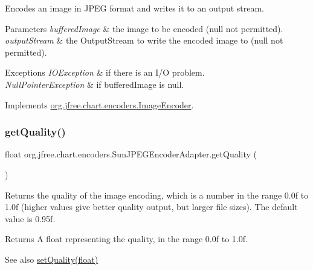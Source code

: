 Encodes an image in J\+P\+EG format and writes it to an output stream.


\begin{DoxyParams}{Parameters}
{\em buffered\+Image} & the image to be encoded ({\ttfamily null} not permitted). \\
\hline
{\em output\+Stream} & the Output\+Stream to write the encoded image to ({\ttfamily null} not permitted).\\
\hline
\end{DoxyParams}

\begin{DoxyExceptions}{Exceptions}
{\em I\+O\+Exception} & if there is an I/O problem. \\
\hline
{\em Null\+Pointer\+Exception} & if {\ttfamily buffered\+Image} is {\ttfamily null}. \\
\hline
\end{DoxyExceptions}


Implements \mbox{\hyperlink{interfaceorg_1_1jfree_1_1chart_1_1encoders_1_1_image_encoder_ad9396ba6a8a9c6f490a31f36f2226dac}{org.\+jfree.\+chart.\+encoders.\+Image\+Encoder}}.

\mbox{\label{classorg_1_1jfree_1_1chart_1_1encoders_1_1_sun_j_p_e_g_encoder_adapter_af9230d0123dd8788669b558a94bb3c03}} 
\subsubsection{\texorpdfstring{get\+Quality()}{getQuality()}}
{\footnotesize\ttfamily float org.\+jfree.\+chart.\+encoders.\+Sun\+J\+P\+E\+G\+Encoder\+Adapter.\+get\+Quality (\begin{DoxyParamCaption}{ }\end{DoxyParamCaption})}

Returns the quality of the image encoding, which is a number in the range 0.\+0f to 1.\+0f (higher values give better quality output, but larger file sizes). The default value is 0.\+95f.

\begin{DoxyReturn}{Returns}
A float representing the quality, in the range 0.\+0f to 1.\+0f.
\end{DoxyReturn}
\begin{DoxySeeAlso}{See also}
\mbox{\hyperlink{classorg_1_1jfree_1_1chart_1_1encoders_1_1_sun_j_p_e_g_encoder_adapter_a00787c98635f7300875c0246d8403712}{set\+Quality(float)}} 
\end{DoxySeeAlso}


